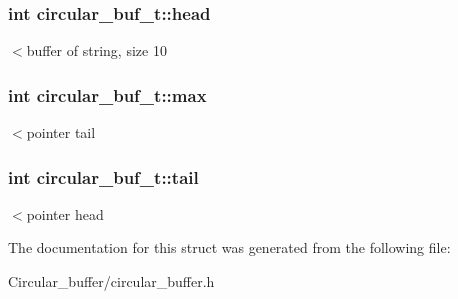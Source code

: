 \subsubsection[{\texorpdfstring{head}{head}}]{\setlength{\rightskip}{0pt plus 5cm}int circular\+\_\+buf\+\_\+t\+::head}\hypertarget{structcircular__buf__t_afcc2394470aaf8e2fdc5d98e6f8dabb3}{}\label{structcircular__buf__t_afcc2394470aaf8e2fdc5d98e6f8dabb3}
$<$buffer of string, size 10 
\subsubsection[{\texorpdfstring{max}{max}}]{\setlength{\rightskip}{0pt plus 5cm}int circular\+\_\+buf\+\_\+t\+::max}\hypertarget{structcircular__buf__t_adaaa093830fc4b55984d7758f4a50450}{}\label{structcircular__buf__t_adaaa093830fc4b55984d7758f4a50450}
$<$pointer tail 
\subsubsection[{\texorpdfstring{tail}{tail}}]{\setlength{\rightskip}{0pt plus 5cm}int circular\+\_\+buf\+\_\+t\+::tail}\hypertarget{structcircular__buf__t_a3edb87c2175ecb1e23b948a4d1145f52}{}\label{structcircular__buf__t_a3edb87c2175ecb1e23b948a4d1145f52}
$<$pointer head 

The documentation for this struct was generated from the following file\+:\begin{DoxyCompactItemize}
\item 
Circular\+\_\+buffer/circular\+\_\+buffer.\+h\end{DoxyCompactItemize}
